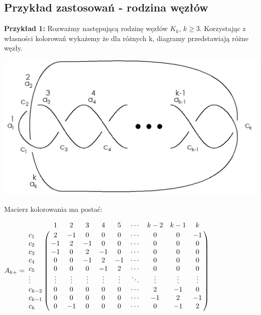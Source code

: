 \subsection{Przykład zastosowań - rodzina węzłów}
\textbf{Przykład 1:}
Rozważmy następującą rodzinę węzłów $K_{k}$, $k \geq 3 $. Korzystając z własności kolorowań wykażemy że dla różnych k, diagramy przedstawiają różne węzły. 
\begin{center}
\includegraphics[scale=0.3]{2/Obrazy/Wezelprzyklad} \\
\end{center}
Macierz kolorowania ma postać:
\begin{center}


$A_{k+}=\bordermatrix{
~       &  1 &  2 &  3 &  4 &  5 & \cdots & k-2  &  k-1 &  k \cr
c_{1}   &  2 & -1 &  0 &  0 &  0 & \cdots &  0   &  0   & -1 \cr
c_{2}   & -1 &  2 & -1 &  0 &  0 & \cdots &  0   &  0   &  0 \cr
c_{3}   & -1 &  0 &  2 & -1 &  0 & \cdots &  0   &  0   &  0 \cr
c_{4}   &  0 &  0 & -1 &  2 & -1 & \cdots &  0   &  0   &  0 \cr
c_{5}   &  0 &  0 &  0 & -1 &  2 & \cdots &  0   &  0   &  0 \cr
\vdots  &  \vdots &  \vdots &  \vdots &  \vdots &  \vdots & \ddots &  \vdots   & \vdots   &  \vdots \cr
c_{k-2} &  0 &  0 &  0 &  0 &  0 & \cdots &  2   & -1   &  0 \cr
c_{k-1} &  0 &  0 &  0 &  0 &  0 & \cdots &  -1  &  2   & -1 \cr
c_{k}   &  0 & -1 &  0 &  0 &  0 & \cdots &  0   & -1   &  2 \cr}
$


\end{center}


